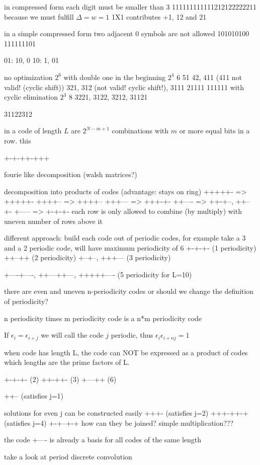 \documentclass[18pt,a4paper]{extarticle}
\begin{document}
in compressed form each digit must be smaller than 3
111111111111212122222211
because we must fulfill $\Delta = w = 1$ 1X1 contributes +1, 12 and 21

in a simple compressed form two adjacent 0 symbols are not allowed
101010100
111111101

01: 10, 0
10: 1, 01


no optimization $2^6$
with double one in the beginning $2^4$
6
51
42, 411 (411 not valid! (cyclic shift))
321, 312 (not valid! cyclic shift!), 3111
21111
111111
with cyclic elimination $2^3$
8
3221, 3122, 3212, 31121

31122312


in a code of length $L$ are $2^{N-m+1}$ combinations with $m$ or more equal bits in a row. this 

+-+-++-+++

fourie like decomposition (walsh matrices?)

decomposition into products of codes (advantage: stays on ring)
+++++- => +++++-
++++-- => ++++--
+++--- => +++-+-
++---- => ++-+--, ++--+-
+----- => +-+-+-
each row is only allowed to combine (by multiply) with uneven number of rows above it

different approach: build each code out of periodic codes, for example take a 3 and a 2 periodic code, will have maximum periodicity of 6
+-+-+- (1 periodicity)
++--++ (2 periodicity)
+--+--, +++--- (3 periodicity)

+----+----, ++---++---, +++++---- (5 periodicity for L=10)

there are even and uneven n-periodicity codes or should we change the definition of periodicity?


n periodicity times m periodicity code is a n*m periodicity code

If $\epsilon_i = \epsilon_{i+j}$ we will call the code $j$ periodic, thus
$\epsilon_i\epsilon_{i+nj} = 1$

when code has length L, the code can NOT be expressed as a product of codes which lengths are the prime factors of L.

+-+-+- (2)
++-++- (3)
+---++ (6)

++-- (satisfies j=1)

solutions for even j can be constructed easily
+++- (satisfies j=2)
+++-++-+ (satisfies j=4)
+-+--+-+
how can they be joined? simple multiplication???


the code +---- is already a basis for all codes of the same length

take a look at period discrete convolution
\end{document}

